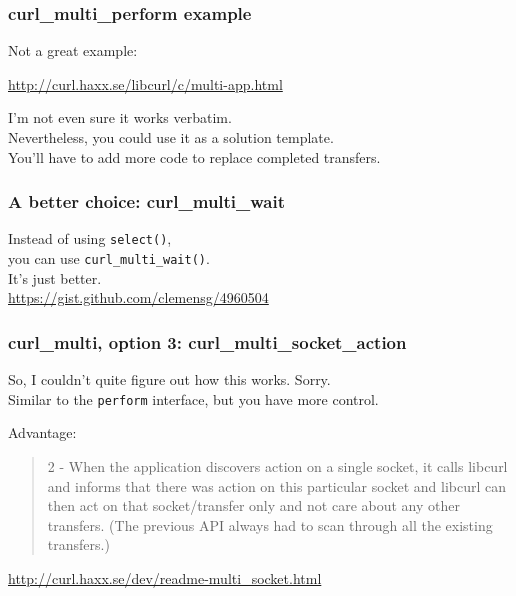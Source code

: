 \begin{frame}
  \frametitle{curl\_multi\_perform example}

  
    Not a great example:

\begin{center}
\url{http://curl.haxx.se/libcurl/c/multi-app.html}
\end{center}

    I'm not even sure it works verbatim.\\[1em]

    Nevertheless, you could use it as a solution template.\\
    You'll have to add more code to replace completed transfers.
  

\end{frame}

\begin{frame}
  \frametitle{A better choice: curl\_multi\_wait}

  
    Instead of using {\tt select()}, \\
    you can use {\tt curl\_multi\_wait()}.\\[2em]
    It's just better.\\
  \url{https://gist.github.com/clemensg/4960504}
  
\end{frame}

\begin{frame}
  \frametitle{curl\_multi, option 3: curl\_multi\_socket\_action}

  
    So, I couldn't quite figure out how this works. Sorry.\\[1em]

    Similar to the {\tt perform} interface, but you have more control.

    Advantage:

\begin{quote}
   2 - When the application discovers action on a single socket, it calls
       libcurl and informs that there was action on this particular socket and
       libcurl can then act on that socket/transfer only and not care about
       any other transfers. (The previous API always had to scan through all
       the existing transfers.)
\end{quote}

\url{http://curl.haxx.se/dev/readme-multi_socket.html}

  
\end{frame}

